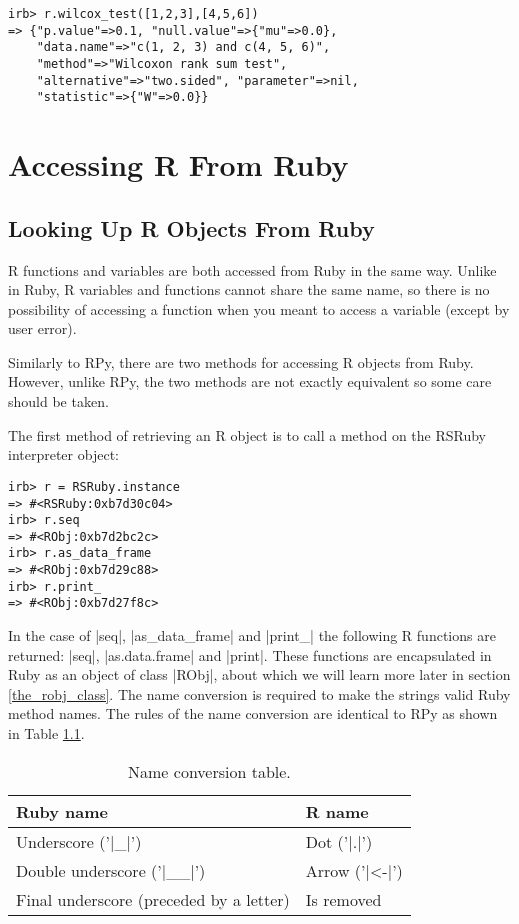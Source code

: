 \documentclass[a4paper,12pt]{book}
\begin{document}
\begin{Verbatim}
irb> r.wilcox_test([1,2,3],[4,5,6])
=> {"p.value"=>0.1, "null.value"=>{"mu"=>0.0}, 
    "data.name"=>"c(1, 2, 3) and c(4, 5, 6)", 
    "method"=>"Wilcoxon rank sum test", 
    "alternative"=>"two.sided", "parameter"=>nil, 
    "statistic"=>{"W"=>0.0}}
\end{Verbatim}

\chapter{Accessing R From Ruby}

\section{Looking Up R Objects From Ruby}

R functions and variables are both accessed from Ruby in the same way. Unlike in Ruby, R variables and functions cannot share the same name, so there is no possibility of accessing a function when you meant to access a variable (except by user error). 

Similarly to RPy, there are two methods for accessing R objects from Ruby. However, unlike RPy, the two methods are not exactly equivalent so some care should be taken.

The first method of retrieving an R object is to call a method on the RSRuby interpreter object:

\begin{Verbatim}
irb> r = RSRuby.instance
=> #<RSRuby:0xb7d30c04>
irb> r.seq
=> #<RObj:0xb7d2bc2c>
irb> r.as_data_frame
=> #<RObj:0xb7d29c88>
irb> r.print_
=> #<RObj:0xb7d27f8c>
\end{Verbatim}

In the case of |seq|, |as_data_frame| and |print_| the following R functions are returned: |seq|, |as.data.frame| and |print|. These functions are encapsulated in Ruby as an object of class |RObj|, about which we will learn more later in section \ref{the_robj_class}. The name conversion is required to make the strings valid Ruby method names. The rules of the name conversion are identical to RPy as shown in Table \ref{name_conversions}.

\begin{table}[h]
\begin{center}
\begin{tabular}{ll} \hline
Ruby name & R name \\ \hline
Underscore ('|_|') & Dot ('|.|') \\
Double underscore ('|__|') & Arrow ('|<-|') \\
Final underscore (preceded by a letter) & Is removed \\ \hline
\end{tabular}
\label{name_conversions}
\caption{Name conversion table.}
\end{center}
\end{table}
\end{document}
